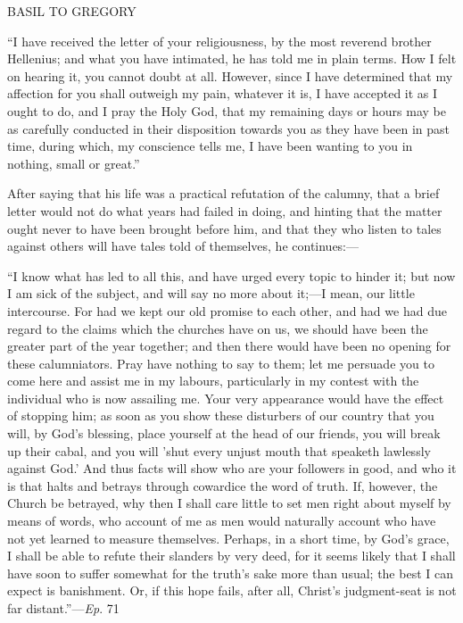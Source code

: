 BASIL TO GREGORY

``I have received the letter of your religiousness, by the most
reverend brother Hellenius; and what you have
intimated, he has told me in plain terms. How I felt on hearing it,
you cannot doubt at all. However, since I have determined that my
affection for you shall outweigh my pain, whatever it is, I have
accepted it as I ought to do, and I pray the Holy God, that my
remaining days or hours may be as carefully conducted in their
disposition towards you as they have been in past time, during which,
my conscience tells me, I have been wanting to you in nothing, small
or great.''

After saying that his life was a practical refutation of the
calumny, that a brief letter would not do what years had failed in
doing, and hinting that the matter ought never to have been brought
before him, and that they who listen to tales against others will have
tales told of themselves, he continues:—

``I know what has led to all this, and have urged every topic
to hinder it; but now I am sick of the subject, and will say no more
about it;—I mean, our little intercourse. For had we kept our old
promise to each other, and had we had due regard to the claims which
the churches have on us, we should have been the greater part of the
year together; and then there would have been no opening for these
calumniators. Pray have nothing to say to them; let me persuade you to
come here and assist me in my labours, particularly in my contest with
the individual who is now assailing me. Your very appearance would
have the effect of stopping him; as soon as you show these disturbers
of our country that you will, by God's blessing, place yourself at the
head of our friends, you will break up their cabal, and you will 'shut
every unjust mouth that speaketh lawlessly against God.' And thus
facts will show who are your followers in good, and who it is that
halts and betrays through cowardice the word of truth. If, however,
the Church be betrayed, why then I shall care little to set men right
about myself by means of words, who account of me as men would
naturally account who have not yet learned to measure themselves.
Perhaps, in a short time, by God's grace, I shall be able to refute
their slanders by very deed, for it seems likely that I shall have
soon to suffer somewhat for the truth's sake more than usual; the best
I can expect is banishment. Or, if this hope fails, after all, Christ's
judgment-seat is not far distant.''—\emph{Ep}. 71

